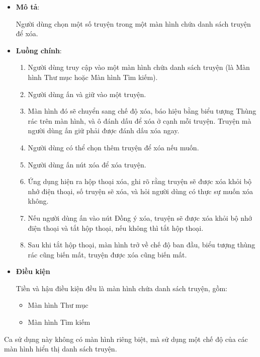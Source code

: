 \documentclass[../../thesis]{subfiles}
\begin{document}
\begin{itemize}
    \item
        \textbf{Mô tả}:

        Người dùng chọn một số truyện trong một màn hình chứa danh sách truyện
        để xóa.
    \item
        \textbf{Luồng chính}:

        \begin{enumerate}
            \item
                Người dùng truy cập vào một màn hình chứa danh sách truyện (là
                Màn hình Thư mục hoặc Màn hình Tìm kiếm).
            \item
                Người dùng ấn và giữ vào một truyện.
            \item
                Màn hình đó sẽ chuyển sang chế độ xóa, báo hiệu bằng biểu tượng
                Thùng rác trên màn hình, và ô đánh dấu để xóa ở cạnh mỗi truyện.
                Truyện mà người dùng ấn giữ phải được đánh dấu xóa ngay.
            \item
                Người dùng có thể chọn thêm truyện để xóa nếu muốn.
            \item
                Người dùng ấn nút xóa để xóa truyện.
            \item
                Ứng dụng hiện ra hộp thoại xóa, ghi rõ rằng truyện sẽ được xóa
                khỏi bộ nhớ điện thoại, số truyện sẽ xóa, và hỏi người dùng có
                thực sự muốn xóa không.
            \item
                Nếu người dùng ấn vào nút Đồng ý xóa, truyện sẽ được xóa khỏi bộ
                nhớ điện thoại và tắt hộp thoại, nếu không thì tắt hộp thoại.
            \item
                Sau khi tắt hộp thoại, màn hình trở về chế độ ban đầu, biểu
                tượng thùng rác cũng biến mất, truyện được xóa cũng biến mất.
        \end{enumerate}
    \item
        \textbf{Điều kiện}

        Tiền và hậu điều kiện đều là màn hình chứa danh sách truyện, gồm:

        \begin{itemize}
            \item
                Màn hình Thư mục
            \item
                Màn hình Tìm kiếm
        \end{itemize}
\end{itemize}

Ca sử dụng này không có màn hình riêng biệt, mà sử dụng một chế độ của các màn
hình hiển thị danh sách truyện.
\end{document}

